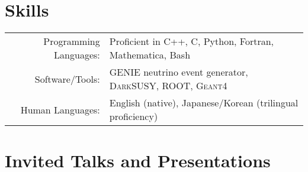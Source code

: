 \documentclass[10pt]{article} %
\begin{document}

\section{Skills}

\noindent\begin{tabularx}{\linewidth}{@{}rl}
	Programming Languages: & Proficient in C++, C, Python, Fortran, Mathematica, Bash\\
	Software/Tools: & \textsc{GENIE} neutrino event generator, \textsc{DarkSUSY}, \textsc{ROOT}, \textsc{Geant4}\\
	Human Languages: & English (native), Japanese/Korean (trilingual proficiency)\\
\end{tabularx}


%
%


\clearpage
\section{Invited Talks and Presentations}
\end{document}
